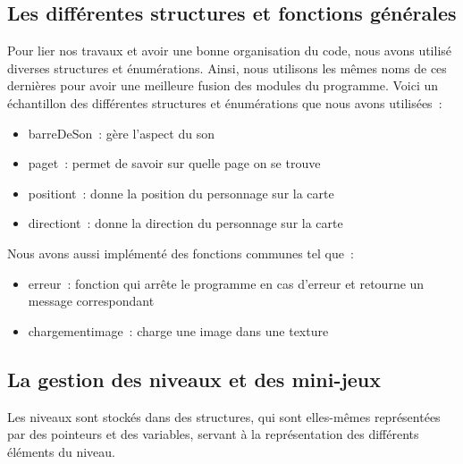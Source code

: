 \documentclass[12pt,a4paper]{article}
\begin{document}
         \subsection{Les différentes structures et fonctions générales}
            \tabto{1cm} Pour lier nos travaux et avoir une bonne organisation du code, nous avons utilisé diverses structures et énumérations. Ainsi, nous utilisons les mêmes noms de ces dernières pour avoir une meilleure fusion des modules du programme. Voici un échantillon des différentes structures et énumérations que nous avons utilisées~:\\

            \begin{itemize}
                \item barreDeSon~: gère l’aspect du son
                \item page\textunderscore t~: permet de savoir sur quelle page on se trouve
                \item position\textunderscore t~: donne la position du personnage sur la carte
                \item direction\textunderscore t~: donne la direction du personnage sur la carte\\
            \end{itemize}

            Nous avons aussi implémenté des fonctions communes tel que~:\\
            
            \begin{itemize}
                \item erreur~: fonction qui arrête le programme en cas d’erreur et retourne un message correspondant
                \item chargement\textunderscore image~: charge une image dans une texture
            \end{itemize}
        
         \subsection{La gestion des niveaux et des mini-jeux}   
            \tabto{1cm} Les niveaux sont stockés dans des structures, qui sont elles-mêmes représentées par des pointeurs et des variables, servant à la représentation des différents éléments du niveau.\\
\end{document}
